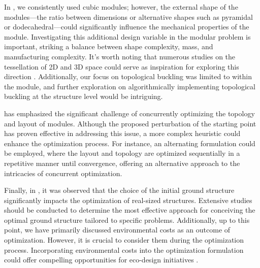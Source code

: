In , we consistently used cubic modules; however, the external shape of the modules—\ie the ratio between dimensions or alternative shapes such as pyramidal or dodecahedral—could significantly influence the mechanical properties of the module. Investigating this additional design variable in the modular problem is important, striking a balance between shape complexity, mass, and manufacturing complexity. It's worth noting that numerous studies on the tessellation of 2D and 3D space could serve as inspiration for exploring this direction . Additionally, our focus on topological buckling was limited to within the module, and further exploration on algorithmically implementing topological buckling at the structure level would be intriguing.

 has emphasized the significant challenge of concurrently optimizing the topology and layout of modules. Although the proposed perturbation of the starting point has proven effective in addressing this issue, a more complex heuristic could enhance the optimization process. For instance, an alternating formulation could be employed, where the layout and topology are optimized sequentially in a repetitive manner until convergence, offering an alternative approach to the intricacies of concurrent optimization.

Finally, in , it was observed that the choice of the initial ground structure significantly impacts the optimization of real-sized structures. Extensive studies should be conducted to determine the most effective approach for conceiving the optimal ground structure tailored to specific problems. Additionally, up to this point, we have primarily discussed environmental costs as an outcome of optimization. However, it is crucial to consider them during the optimization process. Incorporating environmental costs into the optimization formulation could offer compelling opportunities for eco-design initiatives .